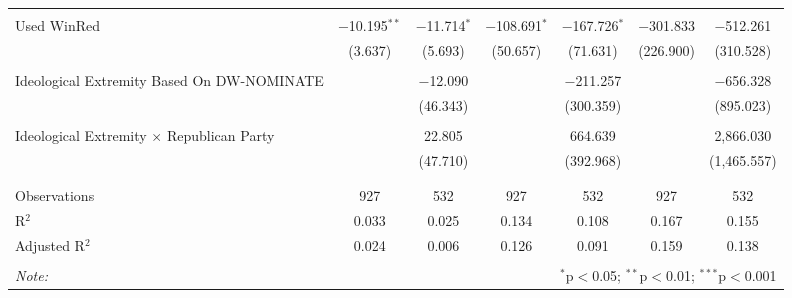 \begin{tabular}{@{\extracolsep{5pt}}lcccccc}
  & & & & & & \\ 
 Used WinRed & $-$10.195$^{**}$ & $-$11.714$^{*}$ & $-$108.691$^{*}$ & $-$167.726$^{*}$ & $-$301.833 & $-$512.261 \\ 
  & (3.637) & (5.693) & (50.657) & (71.631) & (226.900) & (310.528) \\ 
  & & & & & & \\ 
 Ideological Extremity Based On DW-NOMINATE &  & $-$12.090 &  & $-$211.257 &  & $-$656.328 \\ 
  &  & (46.343) &  & (300.359) &  & (895.023) \\ 
  & & & & & & \\ 
 Ideological Extremity $\times$ Republican Party &  & 22.805 &  & 664.639 &  & 2,866.030 \\ 
  &  & (47.710) &  & (392.968) &  & (1,465.557) \\ 
  & & & & & & \\ 
\hline \\[-1.8ex] 
Observations & 927 & 532 & 927 & 532 & 927 & 532 \\ 
R$^{2}$ & 0.033 & 0.025 & 0.134 & 0.108 & 0.167 & 0.155 \\ 
Adjusted R$^{2}$ & 0.024 & 0.006 & 0.126 & 0.091 & 0.159 & 0.138 \\ 
\hline 
\hline \\[-1.8ex] 
\textit{Note:}  & \multicolumn{6}{r}{$^{*}$p$<$0.05; $^{**}$p$<$0.01; $^{***}$p$<$0.001} \\ 
\end{tabular} 
